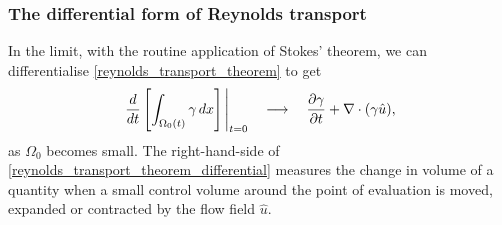 \documentclass[11pt,a4paper]{memoir}
\newcommand{\Part}[2]{\frac{\partial #1}{\partial #2}}
\begin{document}
\subsubsection{The differential form of Reynolds transport}
 In the limit, with the routine application of Stokes' theorem, we can differentialise \eqref{reynolds_transport_theorem}
to get
\begin{equation}\label{reynolds_transport_theorem_differential}
    \eval{\frac{d}{dt}\left[\int_{\Omega_0(t)}\gamma\,dx\right]}_{t=0} \quad\longrightarrow\quad \Part{\gamma}{t} + \nabla \cdot(\gamma \hat{u}),
\end{equation}
as $\Omega_0$ becomes small.
The right-hand-side of \eqref{reynolds_transport_theorem_differential} measures
the change in volume of a quantity when a small control volume around the point of evaluation is moved, expanded or contracted by the flow field $\hat{u}$.
\end{document}
